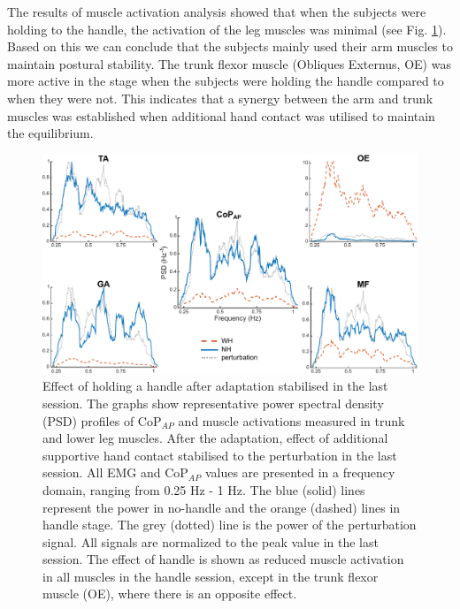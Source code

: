 The results of muscle activation analysis showed that when the subjects were holding to the handle, the activation of the leg muscles was minimal (see Fig. \ref{fig:representativePSD}). Based on this we can conclude that the subjects mainly used their arm muscles to maintain postural stability. The trunk flexor muscle (Obliques Externus, OE) was more active in the stage when the subjects were holding the handle compared to when they were not. This indicates that a synergy between the arm and trunk muscles was established when additional hand contact was utilised to maintain the equilibrium.

\begin{figure}[!t]
	\begin{center}
		\includegraphics[width=\linewidth]{images/representativePSD_oneYaxis-v1.pdf}
		\caption{Effect of holding a handle after adaptation stabilised in the last session. The graphs show representative power spectral density (PSD) profiles of CoP$_{AP}$ and muscle activations measured in trunk and lower leg muscles. After the adaptation, effect of additional supportive hand contact stabilised to the perturbation in the last session. All EMG and CoP$_{AP}$ values are presented in a frequency domain, ranging from 0.25 Hz - 1 Hz. The blue (solid) lines represent the power in no-handle and the orange (dashed) lines in handle stage. The grey (dotted) line is the power of the perturbation signal. All signals are normalized to the peak value in the last session. The effect of handle is shown as reduced muscle activation in all muscles in the handle session, except in the trunk flexor muscle (OE), where there is an opposite effect.}
		\label{fig:representativePSD}
	\end{center}
\end{figure}

